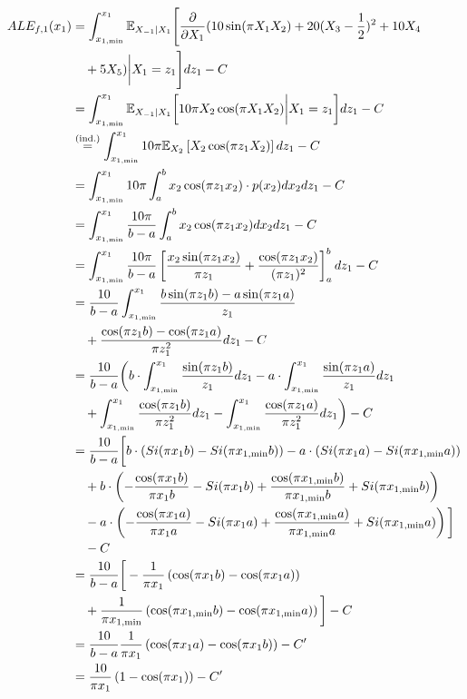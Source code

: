 \documentclass[runningheads]{llncs}
\begin{document}
\begin{align*}
    ALE_{f,1}(x_1) &= \int_{x_{1,\min}}^{x_1} \mathbb{E}_{X_{-1}|X_1}\Bigg[\frac{\partial}{\partial X_1}(10\sin(\pi X_1 X_2) + 20(X_3-\frac{1}{2})^2 + 10X_4 \Bigg. \\
                   &\quad \Bigg. + 5X_5)\bigg|X_1=z_1\Bigg]dz_1 - C\\
                   &= \int_{x_{1,\min}}^{x_1} \mathbb{E}_{X_{-1}|X_1}\bigg[10\pi X_2\cos(\pi X_1 X_2)\bigg|X_1=z_1\bigg]dz_1 - C \\
                   &\stackrel{\scriptsize\text{(ind.)}}{=} \int_{x_{1,\min}}^{x_1} 10\pi \mathbb{E}_{X_2}\left[X_2\cos(\pi z_1 X_2)\right]dz_1 - C \\
                   &= \int_{x_{1,\min}}^{x_1} 10\pi \int_{a}^{b} x_2\cos(\pi z_1 x_2) \cdot p(x_2) dx_2 dz_1 - C \\
                   &= \int_{x_{1,\min}}^{x_1} \frac{10\pi}{b-a} \int_{a}^{b} x_2\cos(\pi z_1 x_2)dx_2 dz_1 - C \\
                   &= \int_{x_{1,\min}}^{x_1} \frac{10\pi}{b-a} \left[\frac{x_2\sin(\pi z_1 x_2)}{\pi z_1} + \frac{\cos(\pi z_1 x_2)}{(\pi z_1)^2}\right]_a^b dz_1 - C \\
                   &= \frac{10}{b-a}\int_{x_{1,\min}}^{x_1} \frac{b\sin(\pi z_1 b) - a\sin(\pi z_1 a)}{z_1} \\ 
                   &\quad + \frac{\cos(\pi z_1 b) - \cos(\pi z_1 a)}{\pi z_1^2} dz_1 - C \\
                   &= \frac{10}{b-a}\bigg(b \cdot \int_{x_{1,\min}}^{x_1} \frac{\sin(\pi z_1 b)}{z_1}dz_1 - a \cdot \int_{x_{1,\min}}^{x_1} \frac{\sin(\pi z_1 a)}{z_1}dz_1 \\
                   &\quad + \int_{x_{1,\min}}^{x_1} \frac{\cos(\pi z_1 b)}{\pi z_1^2}dz_1 - \int_{x_{1,\min}}^{x_1} \frac{\cos(\pi z_1 a)}{\pi z_1^2}dz_1\bigg) - C \\
                   &= \frac{10}{b-a}\bigg[b \cdot (Si(\pi x_1 b)-Si(\pi x_{1,\min} b)) - a \cdot (Si(\pi x_1 a)- Si(\pi x_{1,\min} a)) \\
                   &\quad + b \cdot \left(-\frac{\cos(\pi x_1 b)}{\pi x_1 b} - Si(\pi x_1 b) + \frac{\cos(\pi x_{1,\min} b)}{\pi x_{1,\min} b} + Si(\pi x_{1,\min} b)\right) \\
                   &\quad - a \cdot \left(-\frac{\cos(\pi x_1 a)}{\pi x_1 a} - Si(\pi x_1 a) + \frac{\cos(\pi x_{1,\min} a)}{\pi x_{1,\min} a} + Si(\pi x_{1,\min} a)\right)\bigg] \\
                   &\quad - C \\
                   &= \frac{10}{b-a}\bigg[-\frac{1}{\pi x_1}\left(\cos(\pi x_1 b)-\cos(\pi x_1 a)\right) \\
                   &\quad + \frac{1}{\pi x_{1,\min}}\left(\cos(\pi x_{1,\min} b)-\cos(\pi x_{1,\min} a)\right)\bigg] - C \\
                   &= \frac{10}{b-a}\frac{1}{\pi x_1}\left(\cos(\pi x_1 a) - \cos(\pi x_1 b)\right) - C^\prime \\
                   &= \frac{10}{\pi x_1}\left(1 - \cos(\pi x_1)\right) - C^\prime
\end{align*}
\end{document}
